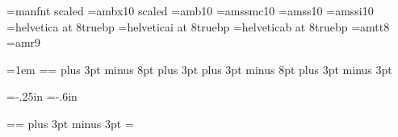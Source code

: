 
\eject %

\font\man=manfnt scaled 
\font\CompJtitle=ambx10 scaled
\font\CompJabstract=amb10
\font\tenssb=amssmc10
\font\tenss=amss10
\font\tenssi=amssi10
\font\eightss=helvetica at 8truebp
\font\eightssi=helveticai at 8truebp
\font\eightssb=helveticab at 8truebp
\font\eighttt=amtt8
\font\ninerm=amr9
\let\mc=\ninerm %

\newdimen\pagewidth \newdimen\pageheight \newdimen{}
\hsize=177mm  \vsize=249mm
\parindent=1em %
\pagewidth=\hsize \pageheight=\vsize {}
\abovedisplayskip=11pt plus 3pt minus 8pt
\abovedisplayshortskip=0pt plus 3pt
\belowdisplayskip=11pt plus 3pt minus 8pt
\belowdisplayshortskip=6pt plus 3pt minus 3pt

\newif\iftitle
\def\titlepage{\global\titletrue} %

\def\leftheadline{\hbox to \pagewidth{%
    \vbox to 8pt{}\hss \eightrm D. E. KNUTH\hss}}
\def\rightheadline{\hbox to \pagewidth{%
    \vbox to 8pt{}\hss \eightrm LITERATE PROGRAMMING\hss}}
\hoffset=-.25in \voffset=-.6in

\newinsert\lefttop \newinsert\righttop
\count{} \count{}
\dimen\lefttop=\maxdimen \dimen\righttop=\maxdimen
\skip\lefttop=25pt plus 3pt minus 3pt
\skip\righttop=\skip\lefttop
\def\leftfloat{\insert\lefttop\bgroup
  \floatingpenalty=0
  \penalty0
  \vbox\bgroup}
\def\rightfloat{\insert\righttop\bgroup
  \floatingpenalty=0
  \penalty0
  \vbox\bgroup}
\def\endfloat{\egroup\egroup}

\def\onepageout#1{\shipout\vbox{ %
    \offinterlineskip %
    \vbox to 9mm{ %
      \iftitle %
        \global\titlefalse %
        \hbox to\pagewidth{\leaders\CJrule\hfill}
      \else\ifodd\pageno \rightheadline\else\leftheadline\fi\fi
      \vfill} %
    \vbox to \pageheight{
      #1 %
      \boxmaxdepth=\maxdepth
      } %
    \baselineskip=7mm \lineskiplimit=0pt
    \hbox to\pagewidth{%
      \ifodd\pageno\hfil\tenss submitted to THE COMPUTER JOURNAL%
        \tenssb\quad\folio
      \else\tenssb\folio\quad
        \tenss submitted to THE COMPUTER JOURNAL\hfil\fi}
    }
  \advancepageno}

